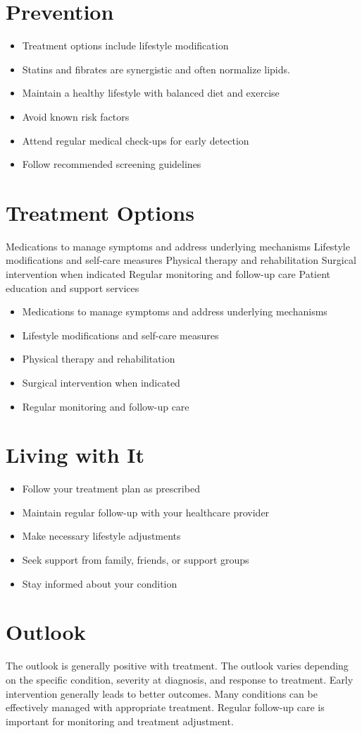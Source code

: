 \section{Prevention}
\begin{itemize}[noitemsep]
  \item Treatment options include lifestyle modification
  \item Statins and fibrates are synergistic and often normalize lipids.
  \item Maintain a healthy lifestyle with balanced diet and exercise
  \item Avoid known risk factors
  \item Attend regular medical check-ups for early detection
  \item Follow recommended screening guidelines
\end{itemize}
\section{Treatment Options}
Medications to manage symptoms and address underlying mechanisms Lifestyle modifications and self-care measures Physical therapy and rehabilitation Surgical intervention when indicated Regular monitoring and follow-up care Patient education and support services

\begin{itemize}[noitemsep]
  \item Medications to manage symptoms and address underlying mechanisms
  \item Lifestyle modifications and self-care measures
  \item Physical therapy and rehabilitation
  \item Surgical intervention when indicated
  \item Regular monitoring and follow-up care
\end{itemize}
\section{Living with It}
\begin{itemize}[noitemsep]
  \item Follow your treatment plan as prescribed
  \item Maintain regular follow-up with your healthcare provider
  \item Make necessary lifestyle adjustments
  \item Seek support from family, friends, or support groups
  \item Stay informed about your condition
\end{itemize}
\section{Outlook}
The outlook is generally positive with treatment. The outlook varies depending on the specific condition, severity at diagnosis, and response to treatment. Early intervention generally leads to better outcomes. Many conditions can be effectively managed with appropriate treatment. Regular follow-up care is important for monitoring and treatment adjustment.
